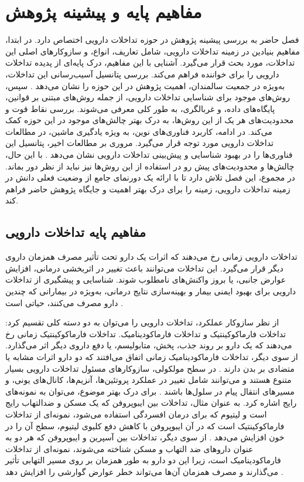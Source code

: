 \chapter{مفاهیم پایه و پیشینه پژوهش}


فصل حاضر به بررسی پیشینه پژوهش در حوزه تداخلات دارویی اختصاص دارد. در ابتدا، مفاهیم بنیادین در زمینه تداخلات دارویی، شامل تعاریف، انواع، و سازوکار‌های اصلی این تداخلات، مورد بحث قرار می‌گیرد. آشنایی با این مفاهیم، درک پایه‌ای از پدیده تداخلات دارویی را برای خواننده فراهم می‌کند. بررسی پتانسیل آسیب‌رسانی این تداخلات، به‌ویژه در جمعیت سالمندان، اهمیت پژوهش در این حوزه را نشان می‌دهد \cite{ref_hines2011}. سپس، روش‌های موجود برای شناسایی تداخلات دارویی، از جمله روش‌های مبتنی بر قوانین، پایگاه‌های داده، و غربالگری، به طور کلی معرفی می‌شوند. بررسی نقاط قوت و محدودیت‌های هر یک از این روش‌ها، به درک بهتر چالش‌های موجود در این حوزه کمک می‌کند. در ادامه، کاربرد فناوری‌های نوین، به ویژه یادگیری ماشین، در مطالعات تداخلات دارویی مورد توجه قرار می‌گیرد. مروری بر مطالعات اخیر، پتانسیل این فناوری‌ها را در بهبود شناسایی و پیش‌بینی تداخلات دارویی نشان می‌دهد \cite{ref_ryu2018, ref_li2023, ref_nyamabo2021}. با این حال، چالش‌ها و محدودیت‌های پیش رو در استفاده از این روش‌ها نیز نباید از نظر دور بماند. در مجموع، این فصل تلاش دارد تا با ارائه یک دورنمای جامع از وضعیت فعلی دانش در زمینه تداخلات دارویی، زمینه را برای درک بهتر اهمیت و جایگاه پژوهش حاضر فراهم کند.

\section{مفاهیم پایه تداخلات دارویی}

تداخلات دارویی زمانی رخ می‌دهند که اثرات یک دارو تحت تأثیر مصرف همزمان داروی دیگر قرار می‌گیرد. این تداخلات می‌توانند باعث تغییر در اثربخشی درمانی، افزایش عوارض جانبی، یا بروز واکنش‌های نامطلوب شوند. شناسایی و پیشگیری از تداخلات دارویی برای بهبود ایمنی بیمار و بهینه‌سازی نتایج درمانی، به‌ویژه در بیمارانی که چندین دارو مصرف می‌کنند، حیاتی است \cite{ref_hines2011}. 


از نظر سازوکار عملکرد، تداخلات دارویی را می‌توان به دو دسته کلی تقسیم کرد: تداخلات فارماکوکینتیک و تداخلات فارماکودینامیک. تداخلات فارماکوکینتیک زمانی رخ می‌دهند که یک دارو بر روند جذب، پخش، متابولیسم، یا دفع داروی دیگر اثر می‌گذارد. از سوی دیگر، تداخلات فارماکودینامیک زمانی اتفاق می‌افتند که دو دارو اثرات مشابه یا متضادی بر بدن دارند \cite{ref_ryu2018}. در سطح مولکولی، سازوکار‌های مسئول تداخلات دارویی بسیار متنوع هستند و می‌توانند شامل تغییر در عملکرد پروتئین‌ها، آنزیم‌ها، کانال‌های یونی، و مسیرهای انتقال پیام در سلول‌ها باشند \cite{ref_he2023}. برای درک بهتر موضوع، می‌توان به نمونه‌های رایج اشاره کرد. به عنوان مثال، تداخلات بین ایبوپروفن که یک مسکن و ضدالتهاب رایج است و لیتیوم که برای درمان افسردگی استفاده می‌شود، نمونه‌ای از تداخلات فارماکوکینتیک است که در آن ایبوپروفن با کاهش دفع کلیوی لیتیوم، سطح آن را در خون افزایش می‌دهد \cite{ref_drugs}. از سوی دیگر، تداخلات بین آسپرین و ایبوپروفن که هر دو به عنوان داروهای ضد التهاب و مسکن شناخته می‌شوند، نمونه‌ای از تداخلات فارماکودینامیک است، زیرا این دو دارو به طور همزمان بر روی مسیر التهابی تأثیر می‌گذارند و مصرف همزمان آن‌ها می‌تواند خطر عوارض گوارشی را افزایش دهد \cite{ref_drugs}.

